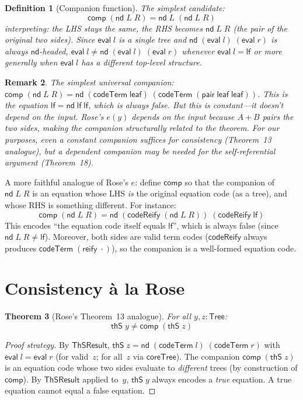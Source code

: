 \documentclass[11pt]{article}
\newtheorem{theorem}{Theorem}
\newtheorem{definition}[theorem]{Definition}
\newtheorem{remark}[theorem]{Remark}
\newcommand{\lf}{\mathsf{lf}}
\newcommand{\nd}{\mathsf{nd}}
\newcommand{\eval}{\mathsf{eval}}
\newcommand{\reify}{\mathsf{reify}}
\newcommand{\codeTerm}{\mathsf{codeTerm}}
\newcommand{\codeReify}{\mathsf{codeReify}}
\newcommand{\thS}{\mathsf{thS}}
\newcommand{\Tree}{\mathsf{Tree}}
\newcommand{\ThSResult}{\mathsf{ThSResult}}
\newcommand{\coreTree}{\mathsf{coreTree}}
\newcommand{\comp}{\mathsf{comp}}
\begin{document}
\begin{definition}[Companion function]
The simplest candidate:
\[
  \comp\;(\nd\;L\;R) = \nd\;L\;(\nd\;L\;R)
\]
interpreting: the LHS stays the same, the RHS becomes $\nd\;L\;R$
(the pair of the original two sides).  Since $\eval\;l$ is a single
tree and $\nd\;(\eval\;l)\;(\eval\;r)$ is always $\nd$-headed,
$\eval\;l \neq \nd\;(\eval\;l)\;(\eval\;r)$ whenever $\eval\;l = \lf$
or more generally when $\eval\;l$ has a different top-level structure.
\end{definition}

\begin{remark}
The simplest \emph{universal} companion: $\comp\;(\nd\;L\;R) =
\nd\;(\codeTerm\;\mathsf{leaf})\;(\codeTerm\;(\mathsf{pair}\;\mathsf{leaf}\;\mathsf{leaf}))$.
This is the equation $\lf = \nd\;\lf\;\lf$, which is always false.
But this is constant---it doesn't depend on the input.  Rose's $e(y)$
depends on the input because $A \mathbin{+} B$ pairs the two sides,
making the companion \emph{structurally related} to the theorem.
For our purposes, even a constant companion suffices for consistency
(Theorem~13 analogue), but a dependent companion may be needed for
the self-referential argument (Theorem~18).
\end{remark}

A more faithful analogue of Rose's $e$: define $\comp$ so that
the companion of $\nd\;L\;R$ is an equation whose LHS \emph{is}
the original equation code (as a tree), and whose RHS is something
different.  For instance:
\[
  \comp\;(\nd\;L\;R) = \nd\;(\codeReify\;(\nd\;L\;R))\;(\codeReify\;\lf)
\]
This encodes ``the equation code itself equals $\lf$'', which is
always false (since $\nd\;L\;R \neq \lf$).  Moreover, both sides
are valid term codes ($\codeReify$ always produces $\codeTerm\;(\reify\;\cdot)$),
so the companion is a well-formed equation code.


\section{Consistency \`a la Rose}\label{sec:consistency}

\begin{theorem}[Rose's Theorem~13 analogue]
For all $y, z : \Tree$:
\[
  \thS\;y \neq \comp\;(\thS\;z)
\]
\end{theorem}

\begin{proof}[Proof strategy]
By $\ThSResult$, $\thS\;z = \nd\;(\codeTerm\;l)\;(\codeTerm\;r)$
with $\eval\;l = \eval\;r$ (for valid~$z$; for all~$z$ via $\coreTree$).
The companion $\comp\;(\thS\;z)$ is an equation code whose two sides
evaluate to \emph{different} trees (by construction of $\comp$).
By $\ThSResult$ applied to~$y$, $\thS\;y$ always encodes a
\emph{true} equation.  A true equation cannot equal a false equation.
\end{proof}
\end{document}

